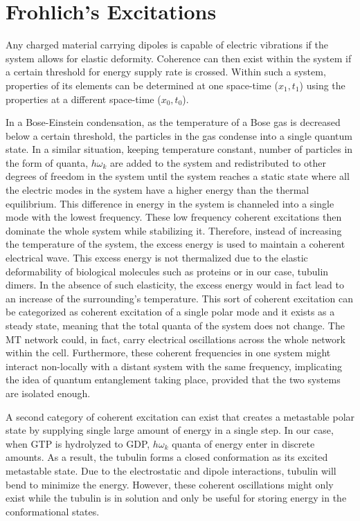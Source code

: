 \documentclass[letterpaper,final,times]{cas-dc}
\numberwithin{equation}{section}
\begin{document}
\section{Frohlich's Excitations}
Any charged material carrying dipoles is capable of electric vibrations if the system allows for elastic deformity\citep{11}. Coherence can then exist within the system if a certain threshold for energy supply rate is crossed. Within such a system, properties of its elements can be determined at one space-time ($x_1, t_1$) using the properties at a different space-time ($x_0 , t_0$)\citep{4}.

In a Bose-Einstein condensation, as the temperature of a Bose gas is decreased below a certain threshold, the particles in the gas condense into a single quantum state. In a similar situation, keeping temperature constant, number of particles in the form of quanta, $h\omega_k$ are added to the system and redistributed to other degrees of freedom in the system until the system reaches a static state where all the electric modes in the system have a higher energy than the thermal equilibrium. This difference in energy in the system is channeled into a single mode with the lowest frequency. These low frequency coherent excitations then dominate the whole system while stabilizing it. Therefore, instead of increasing the temperature of the system, the excess energy is used to maintain a coherent electrical wave\citep{25}. This excess energy is not thermalized due to the elastic deformability of biological molecules such as proteins or in our case, tubulin dimers. In the absence of such elasticity, the excess energy would in fact lead to an increase of the surrounding’s temperature. This sort of coherent excitation can be categorized as coherent excitation of a single polar mode and it exists as a steady state, meaning that the total quanta of the system does not change\citep{26}. The MT network could, in fact, carry electrical oscillations across the whole network within the cell\citep{25}. Furthermore, these coherent frequencies in one system might interact non-locally with a distant system with the same frequency, implicating the idea of quantum entanglement taking place, provided that the two systems are isolated enough.

A second category of coherent excitation can exist that creates a metastable polar state by supplying single large amount of energy in a single step. In our case, when GTP is hydrolyzed to GDP, $h\omega_k$ quanta of energy enter in discrete amounts. As a result, the tubulin forms a closed conformation as its excited metastable state\citep{33}. Due to the electrostatic and dipole interactions, tubulin will bend to minimize the energy. However, these coherent oscillations might only exist while the tubulin is in solution and only be useful for storing energy in the conformational states.
\end{document}
